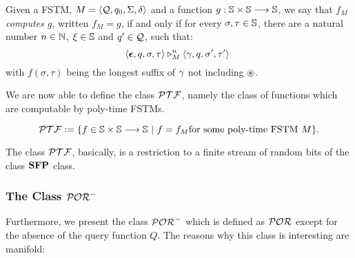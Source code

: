 %

\begin{defn}\label{def:FSTMcomputation}
Given a FSTM,
$M = \langle \textcolor{black}{\mathcal{Q}}, \textcolor{black}{q_0}, \textcolor{black}{\Sigma}, \textcolor{black}{\delta}\rangle$
and a function $g: \mathbb{S}\times \mathbb{S} \longrightarrow \mathbb{S}$,
we say that \emph{$f_M$ computes $g$}, written $f_M=g$,
if and only if for every
$\sigma, \tau \in \mathbb{S}$,
there are a natural number $n\in \mathbb{N}$, $\textcolor{black}{\xi}\in \mathbb{S}$ and $\textcolor{black}{q'} \in \mathcal{Q}$,
such that:
$$
\langle \bm{\epsilon}, q, \sigma, \tau\rangle \triangleright^n_M
\langle \gamma,  q, \sigma', \tau'\rangle\
$$
with $f(\sigma, \tau)$ being
the longest suffix of $\textcolor{black}{\gamma}$ not including
$\textcolor{black}{\circledast}$.
\end{defn}




We are now able to define the class
$\mathcal{PTF}$, namely the class of functions
which are computable by poly-time FSTMs.



\begin{defn}\label{df:poly-time}
$$
\mathcal{PTF} := \{f \in \mathbb{S} \times \mathbb{S} \longrightarrow \mathbb{S} \ | \ f=f_M \text{for some poly-time FSTM $M$}\}.
$$
\end{defn}

\noindent
The class $\mathcal{PTF}$, basically, is a restriction to a finite stream of random bits
of the class $\mathbf{SFP}$ class.









\subsubsection{The Class $\mathcal{POR}^-$}
\label{sub:por-o}

%
Furthermore, we present the class
$\mathcal{POR}^-$ which is defined as
$\mathcal{POR}$ except for the
absence of the query function $Q$.
%
The reasons why this class is interesting are manifold:


